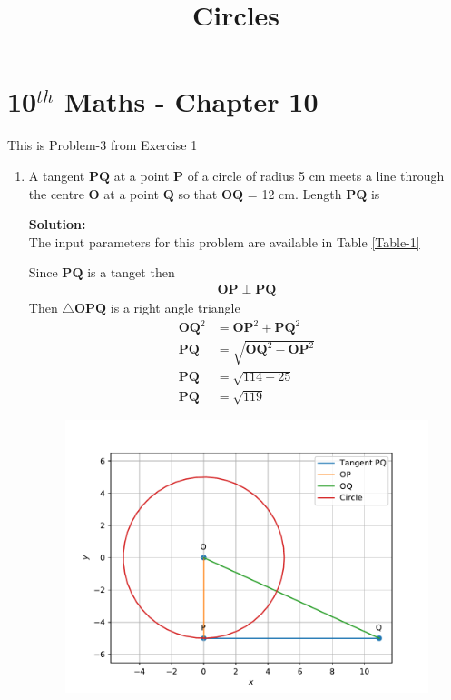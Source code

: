 \documentclass[12pt]{article}
\newcommand{\solution}{\noindent \textbf{Solution: }}
\let\vec\mathbf
\begin{document}
\begin{center}
\enlargethispage{-4cm}
\title{\textbf{Circles}}
\date{\vspace{-5ex}} %
\maketitle
\end{center}
\setcounter{page}{1}
\section*{10$^{th}$ Maths - Chapter 10}
This is Problem-3 from Exercise 1
\begin{enumerate}
	\item A tangent $\vec{PQ}$ at a point $\vec{P}$ of a circle of radius 5 cm meets a line through the centre $\vec{O}$ at a point $\vec{Q}$ so that $\vec{OQ}$ = 12 cm. Length $\vec{PQ}$ is

\solution \\The input parameters for this problem are available in Table \eqref{Table-1}
\begin{table}[ht!]\centering

\caption{}
\label{Table-1}	
\end{table}

Since $\vec{PQ}$ is a tanget then
		\begin{align}
\vec{OP}\perp\vec{PQ}
		\end{align}
Then $\triangle\vec{OPQ}$ is a right angle triangle
\begin{align}
\vec{OQ}^2&=\vec{OP}^2+\vec{PQ}^2\\
	\vec{PQ}&=\sqrt{\vec{OQ}^2-\vec{OP}^2}\\
	\vec{PQ}&=\sqrt{114-25}\\
\vec{PQ}&=\sqrt{119}
		\end{align}
\begin{figure}[!h]
\begin{center}
\includegraphics[width=\columnwidth]{figs/fig.pdf}
\end{center}
\caption{}
\label{fig:Fig1}
\end{figure}
\end{enumerate}
\end{document}
